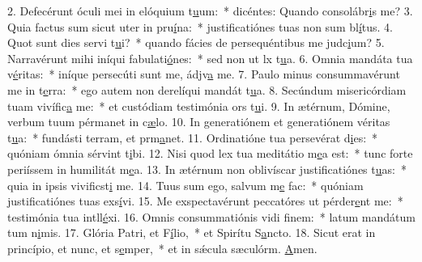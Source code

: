 2. Defecérunt óculi mei in elóquium t\uline{u}um:~* dicéntes: Quando consolábr\uline{i}s me?
3. Quia factus sum sicut uter in pru\uline{í}na:~* justificatiónes tuas non sum bl\uline{í}tus.
4. Quot sunt dies servi t\uline{u}i?~* quando fácies de persequéntibus me judc\uline{i}um?
5. Narravérunt mihi iníqui fabulati\uline{ó}nes:~* sed non ut lx t\uline{u}a.
6. Omnia mandáta tua v\uline{é}ritas:~* iníque persecúti sunt me, ádjv\uline{a} me.
7. Paulo minus consummavérunt me in t\uline{e}rra:~* ego autem non derelíqui mandát t\uline{u}a.
8. Secúndum misericórdiam tuam vivífic\uline{a} me:~* et custódiam testimónia ors t\uline{u}i.
9. In ætérnum, Dómine, verbum tuum pérmanet in c\uline{æ}lo.
10. In generatiónem et generatiónem véritas t\uline{u}a:~* fundásti terram, et prm\uline{a}net.
11. Ordinatióne tua persevérat d\uline{i}es:~* quóniam ómnia sérvint t\uline{i}bi.
12. Nisi quod lex tua meditátio m\uline{e}a est:~* tunc forte periíssem in humilitát m\uline{e}a.
13. In ætérnum non oblivíscar justificatiónes t\uline{u}as:~* quia in ipsis vivificst\uline{i} me.
14. Tuus sum ego, salvum m\uline{e} fac:~* quóniam justificatiónes tuas exs\uline{í}vi.
15. Me exspectavérunt peccatóres ut pérder\uline{e}nt me:~* testimónia tua intll\uline{é}xi.
16. Omnis consummatiónis vidi f\uline{i}nem:~* latum mandátum tum n\uline{i}mis.
17. Glória Patri, et F\uline{í}lio,~* et Spirítu S\uline{a}ncto.
18. Sicut erat in princípio, et nunc, et s\uline{e}mper,~* et in sǽcula sæculórm. \uline{A}men.
